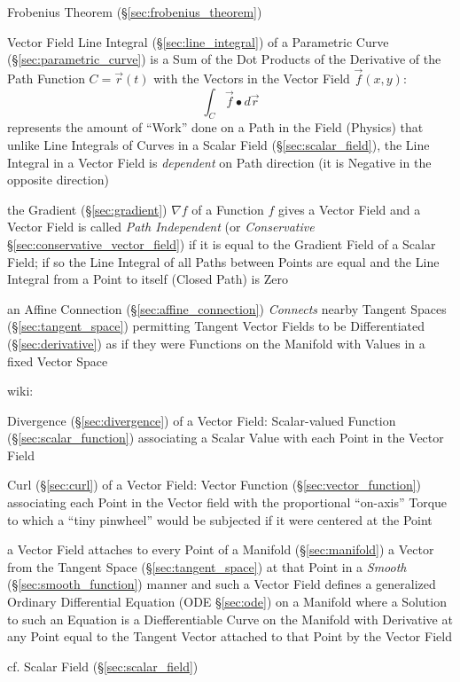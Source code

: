 Frobenius Theorem (\S\ref{sec:frobenius_theorem})

Vector Field Line Integral (\S\ref{sec:line_integral}) of a Parametric Curve
(\S\ref{sec:parametric_curve}) is a Sum of the Dot Products of the Derivative
of the Path Function $C = \vec{r}(t)$ with the Vectors in the Vector Field
$\vec{f}(x,y)$:
\[
  \int_C \vec{f} \bullet d\vec{r}
\]
represents the amount of ``Work'' done on a Path in the Field (Physics)
that unlike Line Integrals of Curves in a Scalar Field
(\S\ref{sec:scalar_field}), the Line Integral in a Vector Field is
\emph{dependent} on Path direction (it is Negative in the opposite direction)

the Gradient (\S\ref{sec:gradient}) $\nabla f$ of a Function $f$ gives a Vector
Field and a Vector Field is called \emph{Path Independent} (or
\emph{Conservative} \S\ref{sec:conservative_vector_field}) if it is equal to
the Gradient Field of a Scalar Field; if so the Line Integral of all Paths
between Points are equal and the Line Integral from a Point to itself (Closed
Path) is Zero

\fist an Affine Connection (\S\ref{sec:affine_connection}) \emph{Connects}
nearby Tangent Spaces (\S\ref{sec:tangent_space}) permitting Tangent Vector
Fields to be Differentiated (\S\ref{sec:derivative}) as if they were Functions
on the Manifold with Values in a fixed Vector Space

wiki:

Divergence (\S\ref{sec:divergence}) of a Vector Field: Scalar-valued Function
(\S\ref{sec:scalar_function}) associating a Scalar Value with each Point in
the Vector Field

Curl (\S\ref{sec:curl}) of a Vector Field: Vector Function
(\S\ref{sec:vector_function}) associating each Point in the Vector field with
the proportional ``on-axis'' Torque to which a ``tiny pinwheel'' would be
subjected if it were centered at the Point

a Vector Field attaches to every Point of a Manifold (\S\ref{sec:manifold}) a
Vector from the Tangent Space (\S\ref{sec:tangent_space}) at that Point in a
\emph{Smooth} (\S\ref{sec:smooth_function}) manner and such a Vector Field
defines a generalized Ordinary Differential Equation (ODE \S\ref{sec:ode}) on a
Manifold where a Solution to such an Equation is a Diefferentiable Curve on the
Manifold with Derivative at any Point equal to the Tangent Vector attached to
that Point by the Vector Field

cf. Scalar Field (\S\ref{sec:scalar_field})

